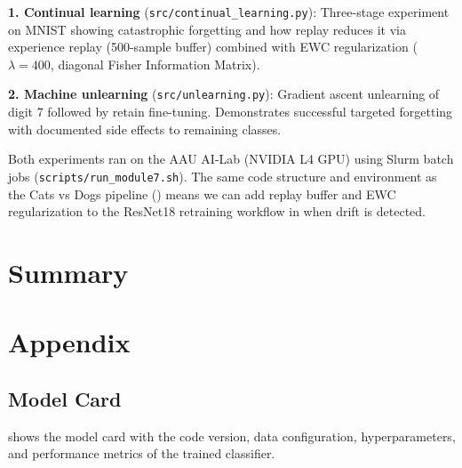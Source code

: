 \documentclass[10pt,twocolumn,letterpaper]{article}
\begin{document}
\textbf{1. Continual learning} (\texttt{src/continual\_learning.py}): Three-stage experiment on MNIST showing catastrophic forgetting and how replay reduces it via experience replay (500-sample buffer) combined with EWC regularization ($\lambda=400$, diagonal Fisher Information Matrix).

\textbf{2. Machine unlearning} (\texttt{src/unlearning.py}): Gradient ascent unlearning of digit 7 followed by retain fine-tuning. Demonstrates successful targeted forgetting with documented side effects to remaining classes.

Both experiments ran on the AAU AI-Lab (NVIDIA L4 GPU) using Slurm batch jobs (\texttt{scripts/run\_module7.sh}). The same code structure and environment as the Cats vs Dogs pipeline () means we can add replay buffer and EWC regularization to the ResNet18 retraining workflow in  when drift is detected.

\section{Summary}


\section{Appendix}\label{sec:appendix}

\subsection{Model Card}
 shows the model card with the code version, data configuration, hyperparameters, and performance metrics of the trained classifier.
\end{document}
